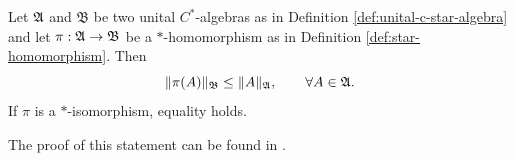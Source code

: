\begin{proposition}
	\label{prop:homomorphism-norm-bound}
	Let $\mathfrak{A}$ and $\mathfrak{B}$ be two unital $C^*$-algebras as in Definition \ref{def:unital-c-star-algebra} and let $\pi : \mathfrak{A} \to \mathfrak{B}$ be a $*$-homomorphism as in Definition \ref{def:star-homomorphism}. Then
	\begin{equation}
		\|\pi(A)\|_{\mathfrak{B}} \le \|A\|_{\mathfrak{A}}, \qquad \forall A \in \mathfrak{A}.\label{eq:homom-norm-bound}
	\end{equation}
	If $\pi$ is a $*$-isomorphism, equality holds.
\end{proposition}
\noindent The proof of this statement can be found in \cite[Proposition 2.2.3]{strocchiIntroductionMathematicalStructure2005}.
%	

